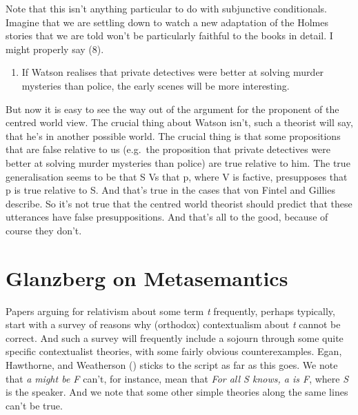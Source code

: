\documentclass[
  10pt,
  letterpaper,
  DIV=11,
  numbers=noendperiod,
  twoside]{scrartcl}
\providecommand{\tightlist}{%
  \setlength{\itemsep}{0pt}\setlength{\parskip}{0pt}}\usepackage{longtable,booktabs,array}
\begin{document}
Note that this isn't anything particular to do with subjunctive
conditionals. Imagine that we are settling down to watch a new
adaptation of the Holmes stories that we are told won't be particularly
faithful to the books in detail. I might properly say (8).

\begin{enumerate}
\def\labelenumi{\arabic{enumi}.}
\setcounter{enumi}{7}
\tightlist
\item
  If Watson realises that private detectives were better at solving
  murder mysteries than police, the early scenes will be more
  interesting.
\end{enumerate}

But now it is easy to see the way out of the argument for the proponent
of the centred world view. The crucial thing about Watson isn't, such a
theorist will say, that he's in another possible world. The crucial
thing is that some propositions that are false relative to us (e.g.~the
proposition that private detectives were better at solving murder
mysteries than police) are true relative to him. The true generalisation
seems to be that S Vs that p, where V is factive, presupposes that p is
true relative to S. And that's true in the cases that von Fintel and
Gillies describe. So it's not true that the centred world theorist
should predict that these utterances have false presuppositions. And
that's all to the good, because of course they don't.

\section{Glanzberg on Metasemantics}\label{glanzberg-on-metasemantics}

Papers arguing for relativism about some term \emph{t} frequently,
perhaps typically, start with a survey of reasons why (orthodox)
contextualism about \emph{t} cannot be correct. And such a survey will
frequently include a sojourn through some quite specific contextualist
theories, with some fairly obvious counterexamples. Egan, Hawthorne, and
Weatherson () sticks to the script
as far as this goes. We note that \emph{a} \emph{might be F} can't, for
instance, mean that \emph{For all S knows, a is F}, where \emph{S} is
the speaker. And we note that some other simple theories along the same
lines can't be true.
\end{document}
